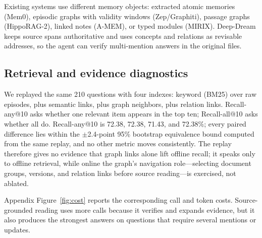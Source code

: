 

Existing systems use different memory objects: extracted atomic memories (Mem0), episodic graphs with validity windows (Zep/Graphiti), passage graphs (HippoRAG-2), linked notes (A-MEM), or typed modules (MIRIX). Deep-Dream keeps source spans authoritative and uses concepts and relations as revisable addresses, so the agent can verify multi-mention answers in the original files.

\subsection{Retrieval and evidence diagnostics}
\label{sec:external-comparisons}
\label{sec:provenance-ablation}

We replayed the same 210 questions with four indexes: keyword (BM25) over raw episodes, plus semantic links, plus graph neighbors, plus relation links. Recall-any@10 asks whether one relevant item appears in the top ten; Recall-all@10 asks whether all do. Recall-any@10 is 72.38, 72.38, 71.43, and 72.38\%; every paired difference lies within the $\pm$2.4-point 95\% bootstrap equivalence bound computed from the same replay, and no other metric moves consistently. The replay therefore gives no evidence that graph links alone lift offline recall; it speaks only to offline retrieval, while online the graph's navigation role---selecting document groups, versions, and relation links before source reading---is exercised, not ablated.

Appendix Figure~\ref{fig:cost} reports the corresponding call and token costs. Source-grounded reading uses more calls because it verifies and expands evidence, but it also produces the strongest answers on questions that require several mentions or updates.
